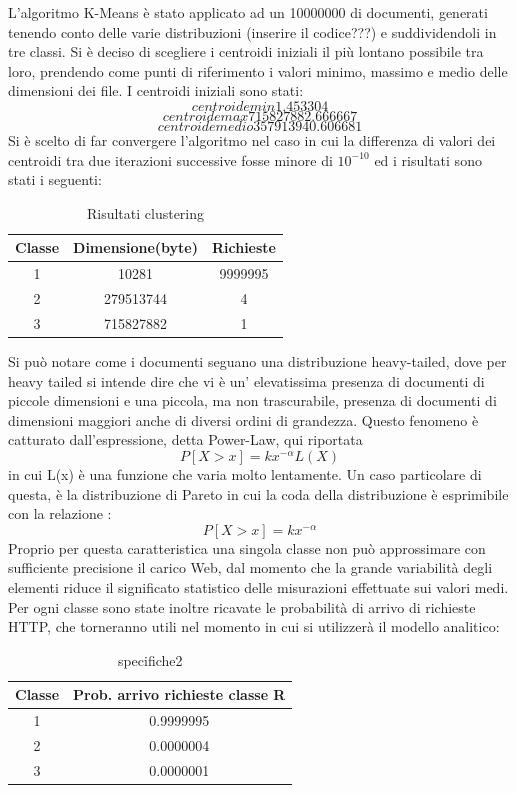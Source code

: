 L'algoritmo K-Means è stato applicato ad un 10000000 di documenti, generati tenendo conto delle varie distribuzioni (inserire il codice???) e suddividendoli in tre classi. Si è deciso di scegliere i centroidi iniziali il più lontano possibile tra loro, prendendo come punti di riferimento i valori minimo, massimo e medio delle dimensioni dei file. I centroidi iniziali sono stati:
$$centroide min 1.453304$$
$$centroide max 715827882.666667 $$
$$centroide medio 357913940.606681 $$
Si è scelto di far convergere l'algoritmo nel caso in cui la differenza di valori dei centroidi tra due iterazioni successive fosse minore di $10^{-10}$ ed i risultati sono stati i seguenti: 
\begin{table}[htbp]
\begin{center}
\begin{tabular}{||c|c|c||}
\hline
Classe	&Dimensione(byte)		&Richieste \\ 
\hline\hline
1 &10281 &9999995\\ \hline
2 &279513744 &4 \\ \hline
3 &715827882 &1 \\ \hline
\end{tabular}
\end{center}
\caption{Risultati clustering}
\label{risclustering}
\end{table}
Si può notare come i documenti seguano una distribuzione heavy-tailed, dove per heavy tailed si intende dire che vi è un' elevatissima presenza di documenti di piccole dimensioni e una piccola, ma non trascurabile, presenza di documenti di dimensioni maggiori anche di diversi ordini di grandezza. Questo fenomeno è catturato dall'espressione, detta Power-Law, qui riportata 
$$P[X > x] = kx^{-\alpha}L(X)$$
in cui L(x) è una funzione che varia molto lentamente. 
Un caso particolare di questa, è la distribuzione di Pareto in cui la coda della distribuzione è esprimibile con la relazione :
$$P[X > x] = kx^{-\alpha}$$
Proprio per questa caratteristica una singola classe non può approssimare con sufficiente precisione il carico Web, dal momento che la grande variabilità degli elementi riduce il significato statistico delle misurazioni effettuate sui valori medi. 
Per ogni classe sono state inoltre ricavate le probabilità di arrivo di richieste HTTP, che torneranno utili nel momento in cui si utilizzerà il modello analitico: 
\begin{table}[H]
\begin{center}
\begin{tabular}{||c|c||}
\hline
Classe		&Prob. arrivo richieste classe R	\\
\hline
\hline
1		&0.9999995	\\
\hline
2		&0.0000004\\
\hline
3		&0.0000001\\
\hline
\end{tabular}
\end{center}
\caption{specifiche2}
\label{test_2}
\end{table}
